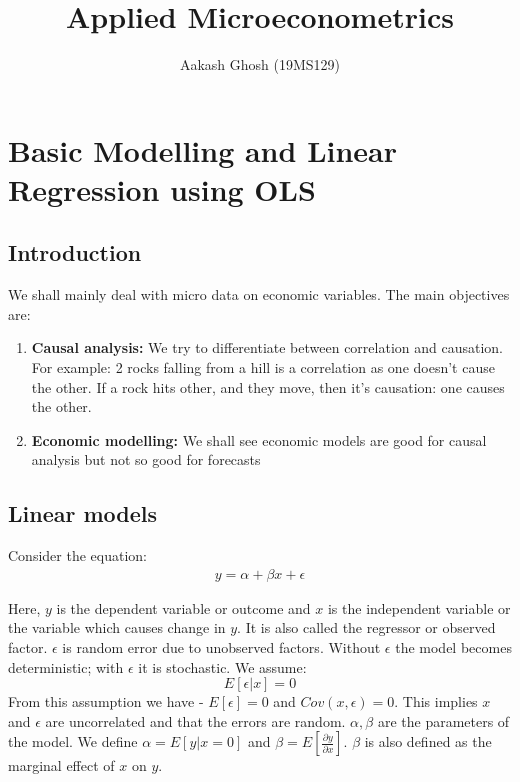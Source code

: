 \documentclass[notoc]{tufte-book}
\title{{Applied Microeconometrics}}
\author[Aakash Ghosh]{Aakash Ghosh (19MS129)}
\begin{document}
\maketitle




\tableofcontents


\lstset{language=R}
\chapter{Basic Modelling and Linear Regression using OLS}
\section{Introduction}
    We shall mainly deal with micro data on economic variables. The main objectives are:
    \begin{enumerate}
        \item \textbf{Causal analysis:} We try to differentiate between correlation and causation. For example: 2 rocks falling from a hill is a correlation as one doesn't cause the other. If a rock hits other, and they move, then it's causation: one causes the other.
        \item \textbf{Economic modelling:} We shall see economic models are good for causal analysis but not so good for forecasts
    \end{enumerate}
\section{Linear models}
Consider the equation:
\begin{align}
  y=\alpha+\beta x+\epsilon  
\end{align}

Here, $y$ is the dependent variable or outcome and $x$ is the independent variable or the variable which causes change in $y$. It is also called the regressor or observed factor. $\epsilon$ is random error due to unobserved factors. Without $\epsilon$ the model becomes deterministic; with $\epsilon$ it is stochastic. We assume:
$$E[\epsilon|x]=0$$
From this assumption we have - 
$E[\epsilon]=0$ and  $Cov(x,\epsilon)=0$.{ This implies $x$ and $\epsilon$ are uncorrelated and that the errors are random}. $\alpha,  \beta$ are the parameters of the model. We define $\alpha=E[y|x=0]$ and $\beta=E\left[\frac{\partial y}{\partial x}\right]$. $\beta$ is also defined as the marginal effect of $x$ on $y$.
\end{document}
